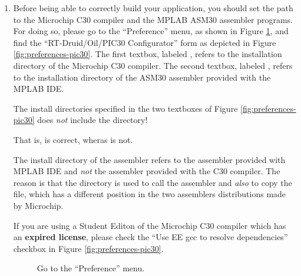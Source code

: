 \begin{enumerate}
\item
Before being able to correctly build your application, you should set
the path to the Microchip C30 compiler and the MPLAB ASM30 assembler
programs. For doing so, please go to the ``Preference'' menu, as shown
in Figure \ref{fig:preferences-menu}, and find the
``RT-Druid/Oil/PIC30 Configurator'' form as depicted in Figure
\ref{fig:preferences-pic30}.  The first textbox, labeled , refers to the installation directory of the Microchip C30
compiler. The second textbox, labeled , refers to the
installation directory of the ASM30 assembler provided with the MPLAB
IDE.

\begin{warning}
The install directories specified in the two textboxes of Figure
\ref{fig:preferences-pic30} does {\em not} include the 
directory! 

That is,  is correct, wheras
 is not.
\end{warning}

\begin{warning}
The install directory of the assembler refers to the assembler
provided with MPLAB IDE and {\em not} the assembler provided with the
C30 compiler. The reason is that the directory is used to call the
assembler and {\em also} to copy the  file, which has a
different position in the two assemblers distributions made by
Microchip.
\end{warning}

\begin{warning}
If you are using a Student Editon of the Microchip C30 compiler which
has an {\bf expired license}, please check the ``Use EE gcc to resolve
dependencies'' checkbox in Figure \ref{fig:preferences-pic30}.
\end{warning}

  \begin{figure}[htb]
\caption{Go to the ``Preference'' menu.}
\label{fig:preferences-menu}
\end{figure}


\end{enumerate}
